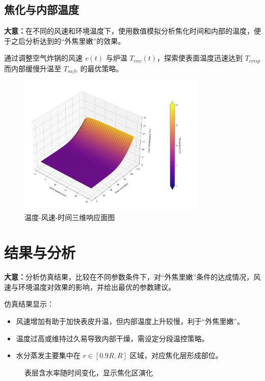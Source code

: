 \documentclass[12pt]{article}
\begin{document}
\subsection{焦化与内部温度}
\begin{summarybox}
	\textbf{大意：}在不同的风速和环境温度下，使用数值模拟分析焦化时间和内部的温度，便于之后分析达到的“外焦里嫩”的效果。
\end{summarybox}
通过调整空气炸锅的风速 $v(t)$ 与炉温 $T_{env}(t)$，探索使表面温度迅速达到 $T_{crisp}$ 而内部缓慢升温至 $T_{safe}$ 的最优策略。

\begin{figure}[htbp]
\centering
\includegraphics[width=0.8\textwidth]{3d.png}
\caption{温度-风速-时间三维响应面图}
\end{figure}

\section{结果与分析}
\begin{summarybox}
	\textbf{大意：}分析仿真结果，比较在不同参数条件下，对“外焦里嫩”条件的达成情况，风速与环境温度对效果的影响，并给出最优的参数建议。
\end{summarybox}
仿真结果显示：
\begin{itemize}
\item 风速增加有助于加快表皮升温，但内部温度上升较慢，利于“外焦里嫩”。
\item 温度过高或维持过久易导致内部干燥，需设定分段温控策略。
\item 水分蒸发主要集中在 $r \in [0.9R, R]$ 区域，对应焦化层形成部位。
\end{itemize}

\begin{figure}[htbp]
\centering
\caption{表层含水率随时间变化，显示焦化区演化}
\end{figure}
\end{document}
